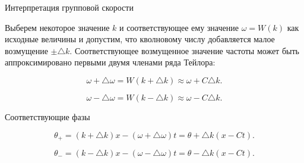 \documentclass[10pt,xcolor=pst,aspectratio=169]{beamer}
\begin{document}
\begin{frame}{Интерпретация групповой скорости}

    \transdissolve[duration=0.1]
    \justifying
    \large

    Выберем некоторое значение $k$ и соответствующее ему значение $\omega = W \left( k \right)$ как исходные величины и допустим, что кволновому числу добавляется малое возмущение $\pm \triangle k$. Соответствующее возмущенное значение частоты может быть аппроксимировано первыми двумя членами ряда Тейлора:

    \[
        \omega + \triangle \omega = W \left( k + \triangle k \right) \approx \omega + C \triangle k .
    \]

    \[
        \omega - \triangle \omega = W \left( k - \triangle k \right) \approx \omega - C \triangle k .
    \]

    Соответствующие фазы

    \[
        \theta_{+} = \left( k + \triangle k \right) x - \left( \omega + \triangle \omega \right) t = \theta + \triangle k \left( x - C t \right) .
    \]

    \[
        \theta_{-} = \left( k - \triangle k \right) x - \left( \omega - \triangle \omega \right) t = \theta - \triangle k \left( x - C t \right) .
    \]

\end{frame}
\end{document}
